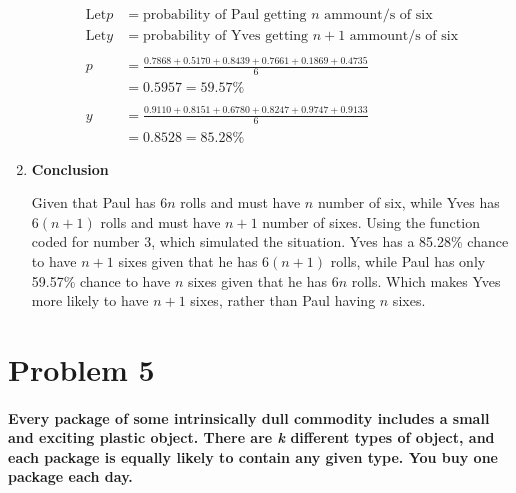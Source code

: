 \documentclass[12pt,letterpaper]{article}
\begin{document}
\begin{enumerate}[label=\Alph*]
        \begin{align*}
          \mbox{Let} p&=\mbox{probability of Paul getting $n$ ammount/s of six}\\
          \mbox{Let} y&=\mbox{probability of Yves getting $n+1$ ammount/s of six}\\\\
          p&=\frac{0.7868+0.5170+0.8439+0.7661+0.1869+0.4735}{6}\\
          &=0.5957=59.57\%\\\\
          y&=\frac{0.9110+0.8151+0.6780+0.8247+0.9747+0.9133}{6}\\
          &=0.8528=85.28\%
        \end{align*}

        \item \textbf{Conclusion}
        
        Given that Paul has $6n$ rolls and must have $n$ number of six, while Yves has $6(n + 1)$ rolls and must have $n+1$ number of sixes. Using the function coded for number 3, which simulated the situation. Yves has a 85.28\% chance to have $n + 1$ sixes given that he has $6(n + 1)$ rolls, while Paul has only 59.57\% chance to have $n$ sixes given that he has $6n$ rolls. Which makes Yves more likely to have $n + 1$ sixes, rather than Paul having $n$ sixes.
    \end{enumerate}



    \newpage


    \section*{Problem 5}
    \paragraph*{Every package of some intrinsically dull commodity includes a small and exciting plastic object. There are \textit{k} different types of object, and each package is equally likely to contain any given type. You buy one package each day.}
    
\end{document}
